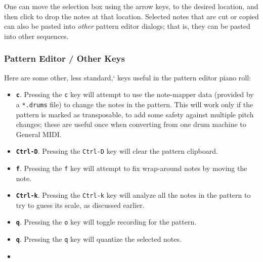    One can move the selection box using the arrow keys, to the
   desired location, and then click to
   drop the notes at that location.
   Selected notes that are cut or copied can also be
   pasted into \textsl{other} pattern editor dialogs; that is, they can be
   pasted into other sequences.

\subsubsection{Pattern Editor / Other Keys}
\label{subsubsec:pattern_editor_other_keys}

   Here are some other, less standard,` keys useful in the pattern editor piano roll:

   \begin{itemize}
      \item
         \textbf{\texttt{c}}.
         Pressing the \texttt{c} key will attempt to use the note-mapper data
         (provided by a \texttt{*.drums} file) to change the notes in the
         pattern.  This will work only if the pattern is marked as transposable,
         to add some safety against multiple pitch changes; these are useful once
         when converting from one drum machine to General MIDI.
      \item
         \textbf{\texttt{Ctrl-D}}.
         Pressing the \texttt{Ctrl-D} key will clear the pattern clipboard.
      \item
         \textbf{\texttt{f}}.
         Pressing the \texttt{f} key will attempt to fix wrap-around notes by
         moving the note.
      \item
         \textbf{\texttt{Ctrl-k}}.
         Pressing the \texttt{Ctrl-k} key will analyze all the notes in the
         pattern to try to guess its scale, as discussed earlier.
      \item
         \textbf{\texttt{q}}.
         Pressing the \texttt{o} key will toggle recording for the pattern.
      \item
         \textbf{\texttt{q}}.
         Pressing the \texttt{q} key will quantize the selected notes.
      \item

\end{itemize}
